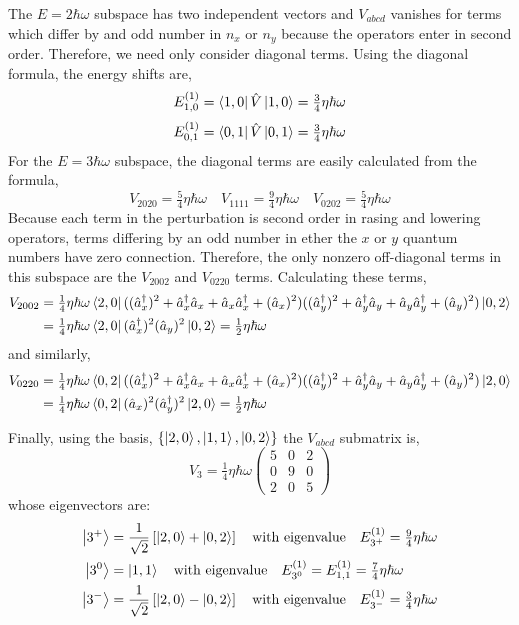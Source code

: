 \documentclass[12pt]{extarticle}
\begin{document}
The $E = 2 \hbar \omega$ subspace has two independent vectors and $V_{abcd}$ vanishes for terms which differ by and odd number in $n_x$ or $n_y$ because the operators enter in second order. Therefore, we need only consider diagonal terms. Using the diagonal formula, the energy shifts are,
\[ E^{(1)}_{1,0} = \left< 1, 0 \right| \hat{V} \left| 1, 0 \right> = \tfrac{3}{4} \eta \hbar \omega\]
\[ E^{(1)}_{0,1} = \left< 0, 1 \right| \hat{V} \left| 0, 1 \right> = \tfrac{3}{4} \eta \hbar \omega\]
For the $E = 3 \hbar \omega$ subspace, the diagonal terms are easily calculated from the formula,
\[V_{2020} = \tfrac{5}{4} \eta \hbar \omega \quad V_{1111} = \tfrac{9}{4} \eta \hbar \omega \quad V_{0202} = \tfrac{5}{4} \eta \hbar \omega \]
Because each term in the perturbation is second order in rasing and lowering operators, terms differing by an odd number in ether the $x$ or $y$ quantum numbers have zero connection. Therefore, the only nonzero off-diagonal terms in this subspace are the $V_{2002}$ and $V_{0220}$ terms. Calculating these terms,
\begin{align*}
V_{2002} & = \tfrac{1}{4} \eta \hbar \omega \left< 2, 0 \right| ((\hat{a}^\dagger_x)^2 + \hat{a}^\dagger_x \hat{a}_x + \hat{a}_x \hat{a}^\dagger_x + (\hat{a}_x)^2)((\hat{a}^\dagger_y)^2 + \hat{a}^\dagger_y \hat{a}_y + \hat{a}_y \hat{a}^\dagger_y + (\hat{a}_y)^2) \left| 0, 2 \right> \\
& = \tfrac{1}{4} \eta \hbar \omega \left< 2, 0 \right| (\hat{a}^\dagger_x)^2 (\hat{a}_y)^2 \left| 0, 2 \right> = \tfrac{1}{2} \eta \hbar \omega 
\end{align*}
and similarly,
\begin{align*}
V_{0220} & = \tfrac{1}{4} \eta \hbar \omega \left< 0, 2 \right| ((\hat{a}^\dagger_x)^2 + \hat{a}^\dagger_x \hat{a}_x + \hat{a}_x \hat{a}^\dagger_x + (\hat{a}_x)^2)((\hat{a}^\dagger_y)^2 + \hat{a}^\dagger_y \hat{a}_y + \hat{a}_y \hat{a}^\dagger_y + (\hat{a}_y)^2) \left| 2, 0 \right> \\
& = \tfrac{1}{4} \eta \hbar \omega \left< 0, 2 \right| (\hat{a}_x)^2 (\hat{a}^\dagger_y)^2 \left| 2, 0 \right> = \tfrac{1}{2} \eta \hbar \omega 
\end{align*}

Finally, using the basis, $\{\left| 2,0 \right>, \left| 1,1 \right>, \left| 0,2 \right>\}$ the $V_{abcd}$ submatrix is,
\[ V_3 = \tfrac{1}{4} \eta \hbar \omega \begin{pmatrix}
5 & 0 & 2 \\
0 & 9 & 0 \\
2 & 0 & 5
\end{pmatrix}\]
whose eigenvectors are:
\begin{align*}
\left| 3^+ \right> & = \frac{1}{\sqrt{2}} \left[ \left| 2,0 \right> + \left| 0,2 \right> \right] \quad \text{with eigenvalue} \quad E^{(1)}_{3^+} = \tfrac{9}{4} \eta \hbar \omega \\ 
\left| 3^0 \right> & = \left| 1,1 \right> \quad \text{with eigenvalue} \quad E^{(1)}_{3^0} = E^{(1)}_{1,1} = \tfrac{7}{4} \eta \hbar \omega \\ 
\left| 3^- \right> & = \frac{1}{\sqrt{2}} \left[ \left| 2,0 \right> - \left| 0,2 \right> \right] \quad \text{with eigenvalue} \quad E^{(1)}_{3^-} = \tfrac{3}{4} \eta \hbar \omega \\ 
\end{align*}
\end{document}
